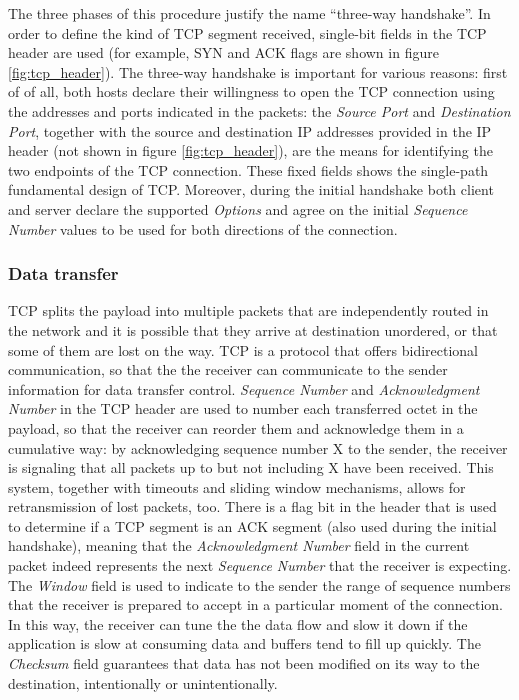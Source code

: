 The three phases of this procedure justify the name ``three-way handshake''. In order to define the kind of TCP segment received, single-bit fields in the TCP header are used (for example, SYN and ACK flags are shown in figure \ref{fig:tcp_header}). 
The three-way handshake is important for various reasons: first of of all, both hosts declare their willingness to open the TCP connection using the addresses and ports indicated in the packets: the \textit{Source Port} and \textit{Destination Port}, together with the source and destination IP addresses provided in the IP header (not shown in figure \ref{fig:tcp_header}), are the means for identifying the two endpoints of the TCP connection. These fixed fields shows the single-path fundamental design of TCP. 
Moreover, during the initial handshake both client and server declare the supported \textit{Options} and agree on the initial \textit{Sequence Number} values to be used for both directions of the connection.

\subsubsection{Data transfer}
TCP splits the payload into multiple packets that are independently routed in the network and it is possible that they arrive at destination unordered, or that some of them are lost on the way. TCP is a protocol that offers bidirectional communication, so that the the receiver can communicate to the sender information for data transfer control. \textit{Sequence Number} and \textit{Acknowledgment Number} in the TCP header are used to number each transferred octet in the payload, so that the receiver can reorder them and acknowledge them in a cumulative way: by acknowledging sequence number X to the sender, the receiver is signaling that all packets up to but not including X have been received. This system, together with timeouts and sliding window mechanisms, allows for retransmission of lost packets, too. There is a flag bit in the header that is used to determine if a TCP segment is an ACK segment (also used during the initial handshake), meaning that the \textit{Acknowledgment Number} field in the current packet indeed represents the next \textit{Sequence Number} that the receiver is expecting. 
The \textit{Window} field is used to indicate to the sender the range of sequence numbers that the receiver is prepared to accept in a particular moment of the connection. In this way, the receiver can tune the the data flow and slow it down if the application is slow at consuming data and buffers tend to fill up quickly. The \textit{Checksum} field guarantees that data has not been modified on its way to the destination, intentionally or unintentionally.

